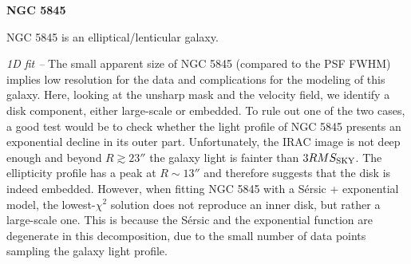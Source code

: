 \documentclass[preprint2]{emulateapj}
\begin{document}
  \clearpage\newpage\noindent
  {\bf NGC 5845 \\}

  NGC 5845 is an elliptical/lenticular galaxy. 


  \emph{1D fit -- }
  The small apparent size of NGC 5845 (compared to the PSF FWHM) implies low resolution for the data 
  and complications for the modeling of this galaxy.
  Here, looking at the unsharp mask and the velocity field, we identify 
  a disk component, either large-scale or embedded.
  To rule out one of the two cases, a good test would be to check whether
  the light profile of NGC 5845 presents an exponential decline in its outer part.
  Unfortunately, the IRAC image is not deep enough and beyond $R \gtrsim 23''$ the galaxy light 
  is fainter than $3 RMS_{\rm SKY}$.
  The ellipticity profile has a peak at $R \sim 13''$ and therefore suggests that the disk is indeed embedded.
  However, when fitting NGC 5845 with a S\'ersic + exponential model, 
  the lowest-$\chi^2$ solution does not reproduce an inner disk, but rather a large-scale one.
  This is because the S\'ersic and the exponential function are degenerate in this decomposition, 
  due to the small number of data points sampling the galaxy light profile.
\end{document}
